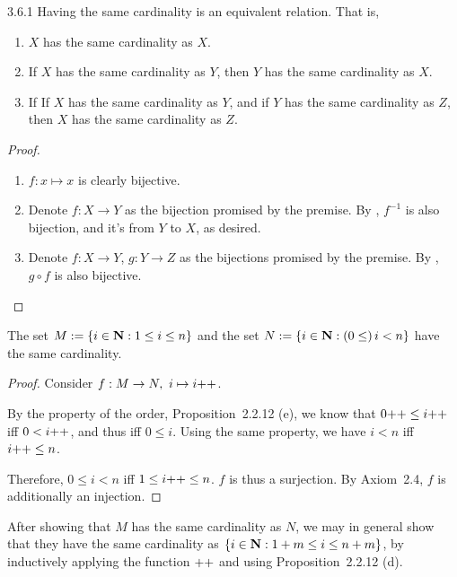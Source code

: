 \begin{exercise}{3.6.1}
	Having the same cardinality is an equivalent relation. That is,
	\begin{enumerate}
		\item {} $X$ has the same cardinality as $X$.
		\item {} If $X$ has the same cardinality as $Y$, then $Y$ has the same cardinality as $X$.
		\item {} If If $X$ has the same cardinality as $Y$, and if $Y$ has the same cardinality as $Z$, then $X$ has the same cardinality as $Z$.
	\end{enumerate}
\end{exercise}
\begin{proof}\leavevmode
	\begin{enumerate}
		\item $f: x \mapsto x$ is clearly bijective.
		\item Denote $f: X \to Y$ as the bijection promised by the premise. By , $f^{-1}$ is also bijection, and it's from $Y$ to $X$, as desired.
		\item Denote $f: X \to Y$, $g: Y \to Z$ as the bijections promised by the premise. By , $g \circ f$ is also bijective.
	\end{enumerate}
\end{proof}

\begin{why}{59}
	The set $M := \{i \in \mathbf{N} : 1 \le i \le n\}$ and the set $N := \{i \in \mathbf{N} : (0 \le)\, i < n\}$ have the same cardinality.
\end{why}
\begin{proof}
	Consider $f: M \to N,\ i \mapsto i{+}{+}$. 
	
	By the property of the order, Proposition~2.2.12 (e), we know that $0{+}{+} \le i{+}{+}$ iff $0 < i{+}{+}$, and thus iff $0 \le i$. Using the same property, we have $i < n$ iff $i{+}{+} \le n$. 
	
	Therefore, $0 \le i < n$ iff $1 \le i{+}{+} \le n$. $f$ is thus a surjection. By Axiom~2.4, $f$ is additionally an injection. 
\end{proof}

After showing that $M$ has the same cardinality as $N$, we may in general show that they have the same cardinality as $\{i \in \mathbf{N} : 1+m \le i \le n+m\}$, by inductively applying the function ${+}{+}$ and using Proposition~2.2.12 (d).

